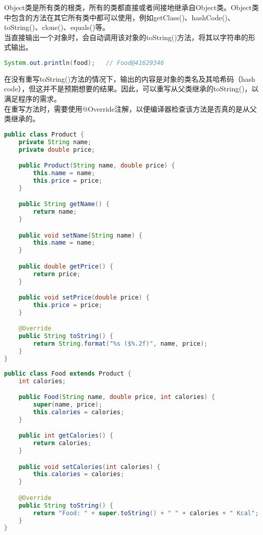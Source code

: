 Object类是所有类的根类，所有的类都直接或者间接地继承自Object类。Object类中包含的方法在其它所有类中都可以使用，例如getClass()、hashCode()、toString()、clone()、equals()等。\\

当直接输出一个对象时，会自动调用该对象的toString()方法，将其以字符串的形式输出。

\vspace{-0.5cm}

\begin{lstlisting}[language=Java]
System.out.println(food);   // Food@41629346
\end{lstlisting}

在没有重写toString()方法的情况下，输出的内容是对象的类名及其哈希码（hash code），但这并不是预期想要的结果。因此，可以重写从父类继承的toString()，以满足程序的需求。\\

在重写方法时，需要使用@Override注解，以便编译器检查该方法是否真的是从父类继承的。\\


\begin{lstlisting}[language=Java]
public class Product {
    private String name;
    private double price;

    public Product(String name, double price) {
        this.name = name;
        this.price = price;
    }

    public String getName() {
        return name;
    }

    public void setName(String name) {
        this.name = name;
    }

    public double getPrice() {
        return price;
    }

    public void setPrice(double price) {
        this.price = price;
    }

    @Override
    public String toString() {
        return String.format("%s ($%.2f)", name, price);
    }
}
\end{lstlisting}

\begin{lstlisting}[language=Java]
public class Food extends Product {
    int calories;

    public Food(String name, double price, int calories) {
        super(name, price);
        this.calories = calories;
    }

    public int getCalories() {
        return calories;
    }

    public void setCalories(int calories) {
        this.calories = calories;
    }

    @Override
    public String toString() {
        return "Food: " + super.toString() + " " + calories + " Kcal";
    }
}
\end{lstlisting}

